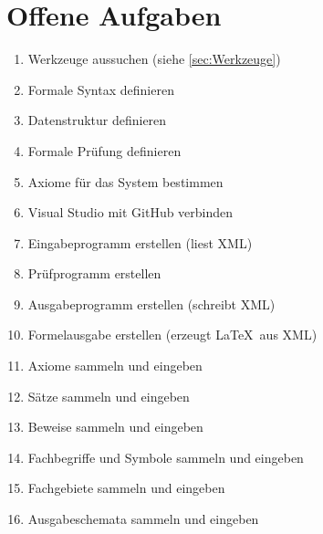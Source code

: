 \documentclass[english,ngerman,parskip=half,headsepline,footsepline]{scrreprt}
\begin{document}
	\section{Offene Aufgaben}
	\begin{enumerate}
		\item Werkzeuge aussuchen (siehe \ref{sec:Werkzeuge})
		\item Formale Syntax definieren
		\item Datenstruktur definieren
		\item Formale Prüfung definieren
		\item Axiome für das System bestimmen
		\item Visual Studio mit GitHub verbinden
		\item Eingabeprogramm erstellen (liest XML)
		\item Prüfprogramm erstellen
		\item Ausgabeprogramm erstellen (schreibt XML)
		\item Formelausgabe erstellen (erzeugt \LaTeX\ aus XML)
		\item Axiome sammeln und eingeben
		\item Sätze sammeln und eingeben
		\item Beweise sammeln und eingeben
		\item Fachbegriffe und Symbole sammeln und eingeben
		\item Fachgebiete sammeln und eingeben
		\item Ausgabeschemata sammeln und eingeben
	\end{enumerate}
		

    \newpage
    \begin{minipage}{\textwidth}
    	\listoftables{}
    \end{minipage}
	\thispagestyle{scrheadings}
    \begin{minipage}{\textwidth}
    	\listoffigures{}       
    \end{minipage}
	\thispagestyle{scrheadings}
	
\end{document}
